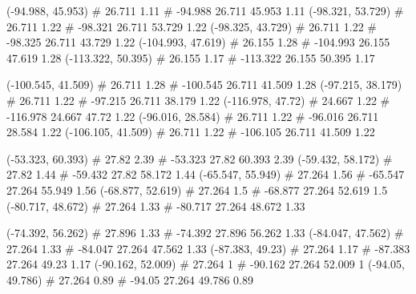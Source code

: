\documentclass[a4paper,openbib,10pt]{article}
\newenvironment{treegraph}{\begin{graph}}{\end{graph}}
\begin{document}
\begin{treegraph}
  (-94.988, 45.953) #     26.711    1.11
   #    -94.988    26.711    45.953    1.11
  (-98.321, 53.729) #     26.711    1.22
   #    -98.321    26.711    53.729    1.22
  (-98.325, 43.729) #     26.711    1.22
   #    -98.325    26.711    43.729    1.22
  (-104.993, 47.619) #     26.155    1.28
   #    -104.993    26.155    47.619    1.28
  (-113.322, 50.395) #     26.155    1.17
   #    -113.322    26.155    50.395    1.17

  (-100.545, 41.509) #     26.711    1.28
   #    -100.545    26.711    41.509    1.28
  (-97.215, 38.179) #     26.711    1.22
   #    -97.215    26.711    38.179    1.22
  (-116.978, 47.72) #     24.667    1.22
   #    -116.978    24.667    47.72    1.22
  (-96.016, 28.584) #     26.711    1.22
   #    -96.016    26.711    28.584    1.22
  (-106.105, 41.509) #     26.711    1.22
   #    -106.105    26.711    41.509    1.22

  (-53.323, 60.393) #     27.82    2.39
   #    -53.323    27.82    60.393    2.39
  (-59.432, 58.172) #     27.82    1.44
   #    -59.432    27.82    58.172    1.44
  (-65.547, 55.949) #     27.264    1.56
   #    -65.547    27.264    55.949    1.56
  (-68.877, 52.619) #     27.264    1.5
   #    -68.877    27.264    52.619    1.5
  (-80.717, 48.672) #     27.264    1.33
   #    -80.717    27.264    48.672    1.33

  (-74.392, 56.262) #     27.896    1.33
   #    -74.392    27.896    56.262    1.33
  (-84.047, 47.562) #     27.264    1.33
   #    -84.047    27.264    47.562    1.33
  (-87.383, 49.23) #     27.264    1.17
   #    -87.383    27.264    49.23    1.17
  (-90.162, 52.009) #     27.264    1
   #    -90.162    27.264    52.009    1
  (-94.05, 49.786) #     27.264    0.89
   #    -94.05    27.264    49.786    0.89


\end{treegraph}
\end{document}
